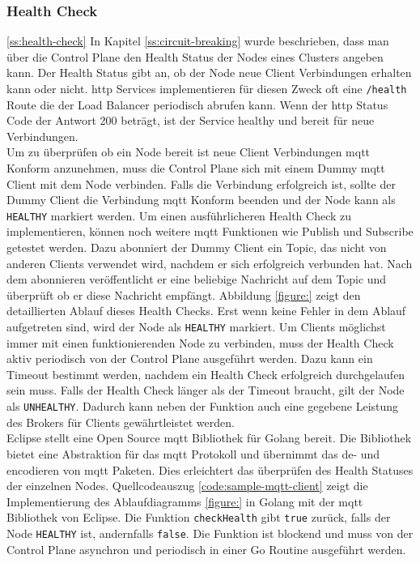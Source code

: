 \subsubsection{Health Check} \ref{ss:health-check}
In Kapitel \ref{ss:circuit-breaking} wurde beschrieben, dass man über die Control Plane den Health Status der Nodes eines Clusters angeben kann. Der Health Status gibt an, ob der Node neue Client Verbindungen erhalten kann oder nicht.
\ac{http} Services implementieren für diesen Zweck oft eine \verb|/health| Route die der Load Balancer periodisch abrufen kann. Wenn der \ac{http} Status Code der Antwort 200 beträgt, ist der Service healthy und bereit für neue Verbindungen.
\\
Um zu überprüfen ob ein Node bereit ist neue Client Verbindungen \ac{mqtt} Konform anzunehmen, muss die Control Plane sich mit einem Dummy \ac{mqtt} Client mit dem Node verbinden. Falls die Verbindung erfolgreich ist, sollte der Dummy Client die Verbindung \ac{mqtt} Konform beenden und der Node kann als \verb|HEALTHY| markiert werden.
Um einen ausführlicheren Health Check zu implementieren, können noch weitere \ac{mqtt} Funktionen wie Publish und Subscribe getestet werden. Dazu abonniert der Dummy Client ein Topic, das nicht von anderen Clients verwendet wird, nachdem er sich erfolgreich verbunden hat. Nach dem abonnieren veröffentlicht er eine beliebige Nachricht auf dem Topic und überprüft ob er diese Nachricht empfängt. Abbildung \ref{figure:} zeigt den detaillierten Ablauf dieses Health Checks. Erst wenn keine Fehler in dem Ablauf aufgetreten sind, wird der Node als \verb|HEALTHY| markiert.
Um Clients möglichst immer mit einen funktionierenden Node zu verbinden, muss der Health Check aktiv periodisch von der Control Plane ausgeführt werden. Dazu kann ein Timeout bestimmt werden, nachdem ein Health Check erfolgreich durchgelaufen sein muss. Falls der Health Check länger als der Timeout braucht, gilt der Node als \verb|UNHEALTHY|. Dadurch kann neben der Funktion auch eine gegebene Leistung des Brokers für Clients gewährtleistet werden.
\\
Eclipse stellt eine Open Source \ac{mqtt} Bibliothek für Golang bereit.
Die Bibliothek bietet eine Abstraktion für das \ac{mqtt} Protokoll und übernimmt das de- und encodieren von \ac{mqtt} Paketen. Dies erleichtert das überprüfen des Health Statuses der einzelnen Nodes.
Quellcodeauszug \ref{code:sample-mqtt-client} zeigt die Implementierung des Ablaufdiagramms \ref{figure:} in Golang mit der \ac{mqtt} Bibliothek von Eclipse. Die Funktion \verb|checkHealth| gibt \verb|true| zurück, falls der Node \verb|HEALTHY| ist, andernfalls \verb|false|. Die Funktion ist blockend und muss von der Control Plane asynchron und periodisch in einer Go Routine ausgeführt werden.
